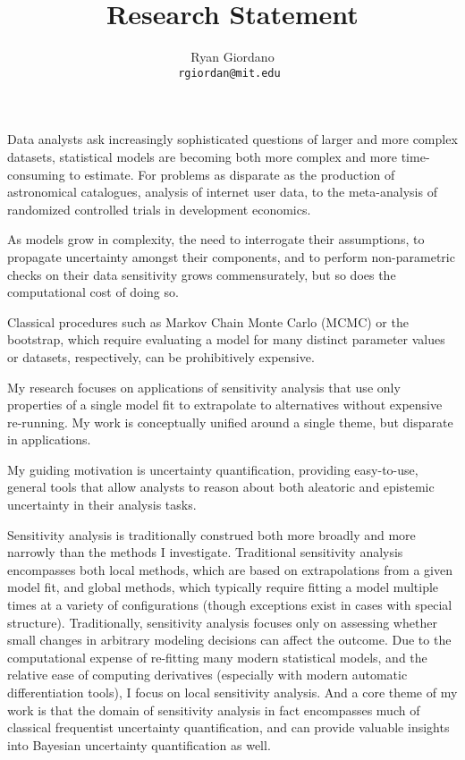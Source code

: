 

\title{Research Statement}

\author{
  Ryan Giordano \\ \texttt{rgiordan@mit.edu }
}



Data analysts ask increasingly sophisticated questions of larger and more
complex datasets, statistical models are becoming both more complex and more
time-consuming to estimate.   For problems as disparate as the production of
astronomical catalogues, analysis of internet user data, to the meta-analysis of
randomized controlled trials in development economics.

As models grow in complexity, the need to interrogate their assumptions,
to propagate uncertainty amongst their components, and to perform non-parametric
checks on their data sensitivity grows commensurately, but so does the
computational cost of doing so.

Classical procedures such as Markov Chain Monte Carlo (MCMC) or the bootstrap,
which require evaluating a model for many distinct parameter values or datasets,
respectively, can be prohibitively expensive.

My research focuses on applications of sensitivity analysis that use only
properties of a single model fit to extrapolate to alternatives without
expensive re-running.  My work is conceptually unified around a single theme,
but disparate in applications.

My guiding motivation is uncertainty quantification, providing easy-to-use,
general tools that allow analysts to reason about both aleatoric and epistemic
uncertainty in their analysis tasks.

Sensitivity analysis is traditionally construed both more broadly and more
narrowly than the methods I investigate.  Traditional sensitivity analysis
encompasses both local methods, which are based on extrapolations from
a given model fit, and global methods, which typically require fitting a model
multiple times at a variety of configurations (though exceptions exist
in cases with special structure).  Traditionally, sensitivity analysis focuses
only on assessing whether small changes in arbitrary modeling decisions
can affect the outcome.  Due to the computational expense of re-fitting
many modern statistical models, and the relative ease of computing
derivatives (especially with modern automatic differentiation tools),
I focus on local sensitivity analysis.  And a core theme of my work is that
the domain of sensitivity analysis in fact encompasses much of classical
frequentist uncertainty quantification, and can provide valuable insights
into Bayesian uncertainty quantification as well.



